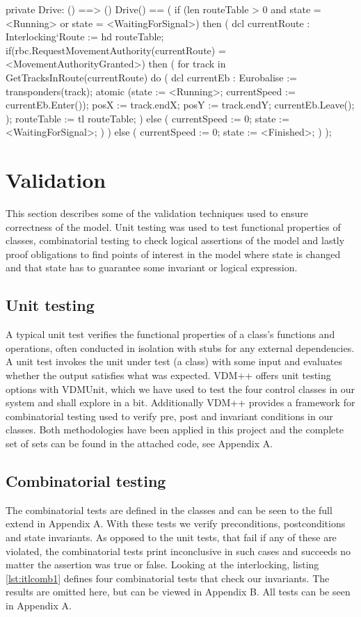 \documentclass[preprint,12pt]{elsarticle}
\begin{document}
\begin{vdmsl}[label=lst:train1,caption={Drive() moves the train along a sequence of routes, requests MA for each route and obeys track speed limits.}]
	private Drive: () ==> ()
	Drive() ==
	(
	if (len routeTable > 0
		and state = <Running> or state = <WaitingForSignal>) then (
		dcl currentRoute : Interlocking`Route := hd routeTable;
		if(rbc.RequestMovementAuthority(currentRoute) = <MovementAuthorityGranted>)
		then (
			for track in GetTracksInRoute(currentRoute) do (
				dcl currentEb : Eurobalise := transponders(track);
				atomic (state := <Running>; currentSpeed := currentEb.Enter());
				posX := track.endX;
				posY := track.endY;
				currentEb.Leave();
				);
			routeTable := tl routeTable;
		) else (
			currentSpeed := 0;
			state := <WaitingForSignal>;
			)
		) else (
			currentSpeed := 0;
			state := <Finished>;
		)
	);
\end{vdmsl}

\section{Validation}

This section describes some of the validation techniques used to ensure correctness of the model. Unit testing was used to test functional properties of classes, combinatorial testing to check logical assertions of the model and lastly proof obligations to find points of interest in the model where state is changed and that state has to guarantee some invariant or logical expression.

\subsection{Unit testing}
A typical unit test verifies the functional properties of a class's functions and operations, often conducted in isolation with stubs for any external dependencies. A unit test invokes the unit under test (a class) with some input and evaluates whether the output satisfies what was expected. VDM++ offers unit testing options with VDMUnit, which we have used to test the four control classes in our system and shall explore in a bit. Additionally VDM++ provides a framework for combinatorial testing used to verify pre, post and invariant conditions in our classes. Both methodologies have been applied in this project and the complete set of sets can be found in the attached code, see Appendix A.

\subsection{Combinatorial testing}
The combinatorial tests are defined in the classes and can be seen to the full extend in Appendix A. With these tests we verify preconditions, postconditions and state invariants. As opposed to the unit tests, that fail if any of these are violated, the combinatorial tests print inconclusive in such cases and succeeds no matter the assertion was true or false. Looking at the interlocking, listing \ref{lst:itlcomb1} defines four combinatorial tests that check our invariants. The results are omitted here, but can be viewed in Appendix B. All tests can be seen in Appendix A.
\end{document}
